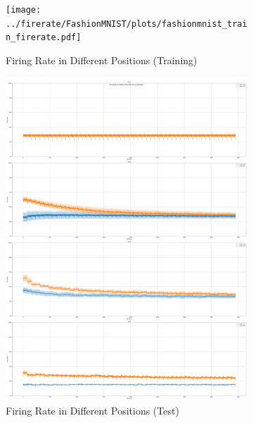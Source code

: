         \begin{figure}[H]
            \centering
            \begin{subfigure}[H]{0.48\textwidth}
                \centering
                \texttt{[image: ../firerate/FashionMNIST/plots/fashionmnist\_train\_firerate.pdf]}
                \caption{Firing Rate in Different Positions (Training)}
            \end{subfigure}
            \hfill
            \begin{subfigure}[H]{0.48\textwidth}
                \centering
                \includegraphics[width=\textwidth]{../firerate/FashionMNIST/plots/fashionmnist_test_firerate.pdf}
                \caption{Firing Rate in Different Positions (Test)}
            \end{subfigure}
            \hfill
            \begin{subfigure}[H]{\textwidth}
                \centering

\end{subfigure}
\end{figure}
